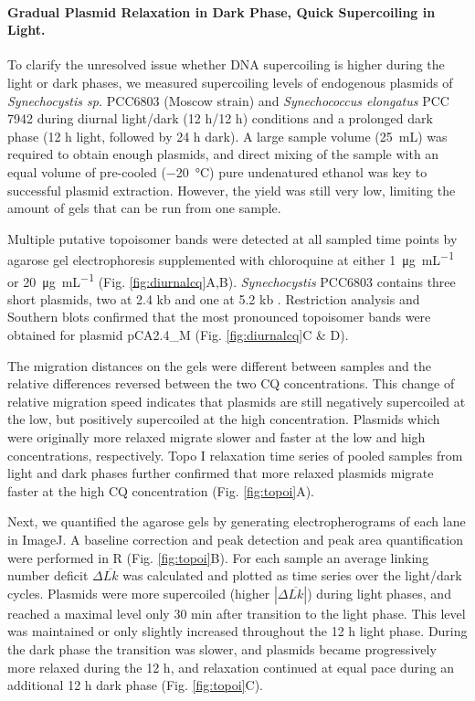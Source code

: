 \documentclass[10pt,a4]{article}
\newcommand{\ugml}{\micro\gram\per\milli\liter}
\newcommand{\mL}{\milli\liter}
\newcommand{\scyst}{\textit{Synechocystis} PCC6803}
\newcommand{\raim}[1]{\begingroup{\color{purple}#1}\endgroup}
\begin{document}
\paragraph{Gradual Plasmid Relaxation in Dark Phase, Quick Supercoiling in
  Light.}  To clarify the unresolved issue whether DNA supercoiling is
higher during the light or dark phases, we measured supercoiling
levels of endogenous plasmids of \textit{Synechocystis sp.} PCC6803
(Moscow strain) \raim{and \textit{Synechococcus elongatus} PCC 7942}
during diurnal light/dark (12 h/12 h) conditions and a prolonged dark
phase (12 h light, followed by 24 h dark).  A large sample volume
(\SI{25}{\mL}) was required to obtain enough plasmids, and direct
mixing of the sample with an equal volume of pre-cooled
(\SI{-20}{\celsius}) pure undenatured ethanol was key to successful
plasmid extraction. However, the yield was still very low, limiting
the amount of gels that can be run from one sample.

Multiple putative topoisomer bands were detected at all sampled time
points by agarose gel electrophoresis supplemented with chloroquine at
either \SI{1}{\ugml} or \SI{20}{\ugml}
(Fig. \ref{fig:diurnalcq}A,B). \scyst{} contains three short plasmids,
two at 2.4 kb \cite{Yang1993b, Yang1994} and one at 5.2 kb
\cite{Xu1997b} . Restriction analysis and Southern blots confirmed
that the most pronounced topoisomer bands were obtained for plasmid
pCA2.4\_M (Fig. \ref{fig:diurnalcq}C \& D).

The migration distances on the gels were different between samples and
the relative differences reversed between the two CQ
concentrations. This change of relative migration speed indicates that
plasmids are still negatively supercoiled at the low, but positively
supercoiled at the high concentration. Plasmids which were originally
more relaxed migrate slower and faster at the low and high
concentrations, respectively.  Topo I relaxation time series of pooled
samples from light and dark phases further confirmed that more relaxed
plasmids migrate faster at the high CQ concentration
(Fig. \ref{fig:topoi}A).

Next, we quantified the agarose gels by generating electropherograms
of each lane in ImageJ. A baseline correction and peak detection and
peak area quantification were performed in R
(Fig. \ref{fig:topoi}B). For each sample an average linking
number deficit $\Delta \overline{Lk}$ was calculated and plotted as time series
over the light/dark cycles.  Plasmids were more supercoiled (higher
$|\Delta \overline{Lk}|$) during light phases, and reached a maximal level only
30 min after transition to the light phase. This level was maintained
or only slightly increased throughout the 12 h light phase.  During
the dark phase the transition was slower, and plasmids became
progressively more relaxed during the 12 h, and relaxation continued
at equal pace during an additional 12 h dark phase
(Fig. \ref{fig:topoi}C).
\end{document}
